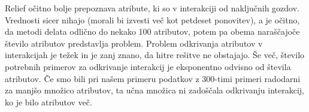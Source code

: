 Relief očitno bolje prepoznava atribute, ki so v interakciji od naključnih gozdov. Vrednosti sicer nihajo (morali bi izvesti več kot petdeset ponovitev), a je očitno, da metodi delata odlično do nekako 100 atributov, potem pa obema naraščajoče število atributov predstavlja problem. Problem odkrivanja atributov v interakcijah je težek in je zanj znano, da hitre rešitve ne obstajajo. Še več, število potrebnih primerov za odkrivanje interakcij je eksponentno odvisno od števila atributov. Če smo bili pri našem primeru podatkov z 300-timi primeri radodarni za manjšo množico atributov, ta učna množica ni zadoščala odkrivanju interakcij, ko je bilo atributov več.

\cleardoublepage
